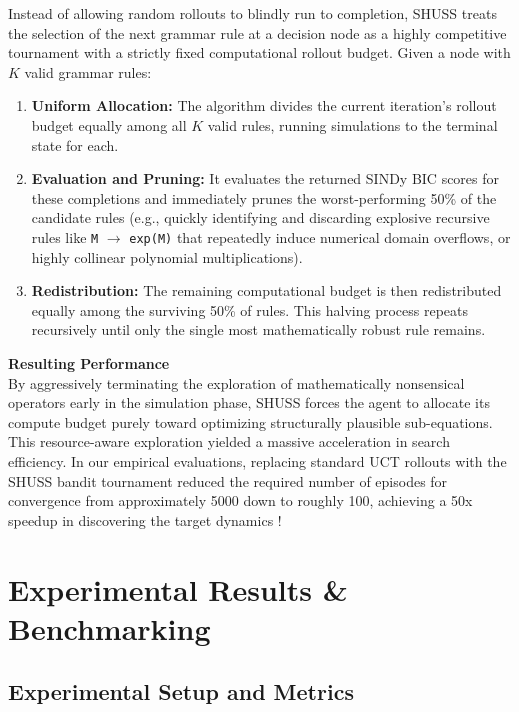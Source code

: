\documentclass[11pt, a4paper]{article}
\begin{document}
Instead of allowing random rollouts to blindly run to completion, SHUSS treats the selection of the next grammar rule at a decision node as a highly competitive tournament with a strictly fixed computational rollout budget. Given a node with $K$ valid grammar rules:
\begin{enumerate}
    \item \textbf{Uniform Allocation:} The algorithm divides the current iteration's rollout budget equally among all $K$ valid rules, running simulations to the terminal state for each.
    \item \textbf{Evaluation and Pruning:} It evaluates the returned SINDy BIC scores for these completions and immediately prunes the worst-performing 50\% of the candidate rules (e.g., quickly identifying and discarding explosive recursive rules like \texttt{M} $\rightarrow$  \texttt{exp(M)} that repeatedly induce numerical domain overflows, or highly collinear polynomial multiplications).
    \item \textbf{Redistribution:} The remaining computational budget is then redistributed equally among the surviving 50\% of rules. This halving process repeats recursively until only the single most mathematically robust rule remains.
\end{enumerate}

\vspace{0.3cm}
\noindent \textbf{Resulting Performance}\\
By aggressively terminating the exploration of mathematically nonsensical operators early in the simulation phase, SHUSS forces the agent to allocate its compute budget purely toward optimizing structurally plausible sub-equations. This resource-aware exploration yielded a massive acceleration in search efficiency. In our empirical evaluations, replacing standard UCT rollouts with the SHUSS bandit tournament reduced the required number of episodes for convergence from approximately 5000 down to roughly 100, achieving a 50x speedup in discovering the target dynamics !


\section{Experimental Results \& Benchmarking}

\subsection{Experimental Setup and Metrics}
\end{document}
